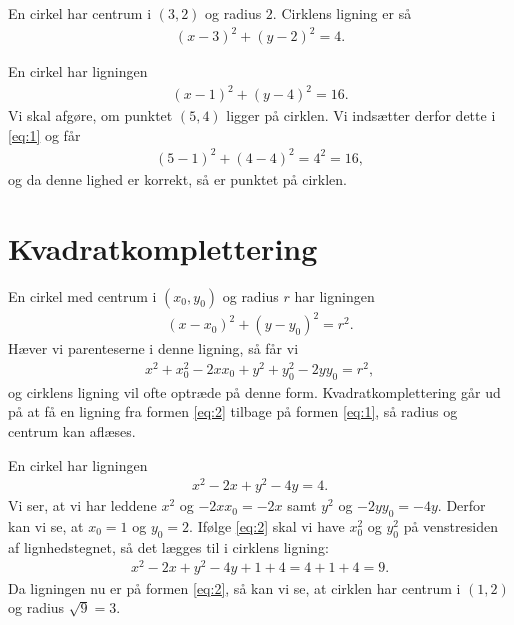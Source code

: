 \begin{exa}
	En cirkel har centrum i $(3,2)$ og radius $2$. Cirklens ligning er så
	\begin{align*}
		(x-3)^2 + (y-2)^2 = 4.
	\end{align*}
\end{exa}

\begin{exa}
	En cirkel har ligningen 
	\begin{align}\label{eq:1}
		(x-1)^2 + (y-4)^2 = 16. 
	\end{align}
	Vi skal afgøre, om punktet $(5,4)$ ligger på cirklen. Vi indsætter derfor dette
	i \eqref{eq:1} og får
	\begin{align*}
		(5-1)^2 + (4-4)^2 = 4^2=16,
	\end{align*}
	og da denne lighed er korrekt, så er punktet på cirklen. 
\end{exa}

\section*{Kvadratkomplettering}

En cirkel med centrum i $(x_0,y_0)$ og radius $r$ har ligningen
\begin{align}\label{eq:1}
	(x-x_0)^2 + (y-y_0)^2 = r^2.
\end{align}
Hæver vi parenteserne i denne ligning, så får vi
\begin{align}\label{eq:2}
	x^2+x_0^2-2xx_0 + y^2+y_0^2-2yy_0 = r^2,
\end{align}
og cirklens ligning vil ofte optræde på denne form. Kvadratkomplettering går ud på at få en ligning fra formen \eqref{eq:2} tilbage på formen \eqref{eq:1}, så radius og centrum kan aflæses.

\begin{exa}
	En cirkel har ligningen 
	\begin{align*}
		x^2-2x+y^2-4y=4.
	\end{align*}
	Vi ser, at vi har leddene $x^2$ og $-2xx_0 = -2x$ samt $y^2$ og $-2yy_0=-4y$. Derfor kan vi se, at $x_0 = 1$ og $y_0 = 2$. Ifølge \eqref{eq:2} skal vi have $x_0^2$
    og $y_0^2$ på venstresiden af lignhedstegnet, så det lægges til i cirklens ligning:
    \begin{align*}
    		x^2-2x+y^2-4y+1+4=4+1+4=9. 
    \end{align*}
   	Da ligningen nu er på formen \eqref{eq:2}, så kan vi se, at cirklen har centrum i $(1,2)$ og radius $\sqrt{9} = 3$.
\end{exa}


